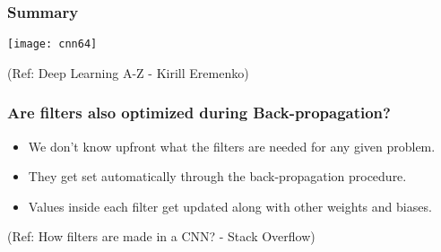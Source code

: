 \begin{frame}[fragile] \frametitle{Summary}

\begin{center}
\texttt{[image: cnn64]}

\tiny{(Ref: Deep Learning A-Z - Kirill Eremenko)}
\end{center}

\end{frame}

\begin{frame}[fragile] \frametitle{Are filters also optimized during Back-propagation?}

\begin{itemize}
\item  We don't know upfront what the filters are needed for any given problem. 
\item They get set automatically through the back-propagation procedure. 
\item Values inside each filter get updated along with other weights and biases.
\end{itemize}

\tiny{(Ref: How filters are made in a CNN? - Stack Overflow)}
\end{frame}




